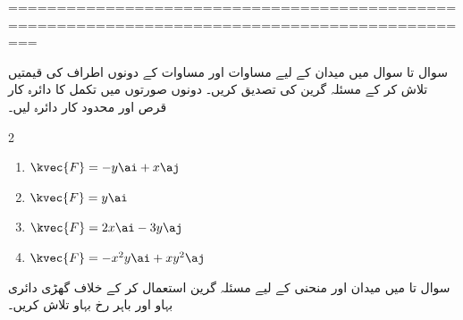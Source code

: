 
===============================================================================================


سوال  تا سوال  میں میدان   کے لیے مساوات     اور  مساوات    کے دونوں اطراف کی قیمتیں تلاش کر کے مسئلہ  گرین کی تصدیق کریں۔ دونوں صورتوں میں تکمل کا دائرہ کار قرص     اور  محدود کار  دائرہ    لیں۔

\begin{multicols}{2}
\begin{enumerate}[]
\item
{}
\(\kvec{F} = -y\ai + x\aj\)
\item
{}
\(\kvec{F} = y\ai\)
\item
{}
\(\kvec{F} = 2x\ai - 3y\aj\)
\item
{}
\(\kvec{F} = -x^2y\ai + xy^2\aj\)
\end{enumerate}
\end{multicols}

سوال  تا   میں میدان   اور منحنی   کے لیے مسئلہ گرین استعمال کر کے  خلاف گھڑی دائری بہاو  اور باہر  رخ بہاو تلاش کریں۔

